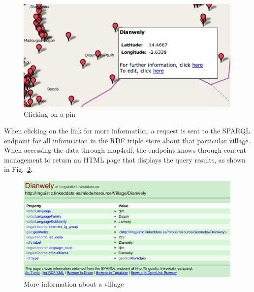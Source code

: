 \begin{figure}[htb!p]
\centering
\includegraphics[width=0.99\textwidth]{img/pin.png}
\caption{Clicking on a pin}
\label{pin.png}
\end{figure}

When clicking on the link for more information, a request is sent to the SPARQL endpoint for all information in the RDF triple store about that particular village. When accessing the data through map4rdf, the endpoint knows through content management to return an HTML page that displays the query results, as shown in Fig.\ \ref{more_information.png}.

\begin{figure}[htb!p]
\centering
\includegraphics[width=0.99\textwidth]{img/more_information.png}
\caption{More information about a village}
\label{more_information.png}
\end{figure}

